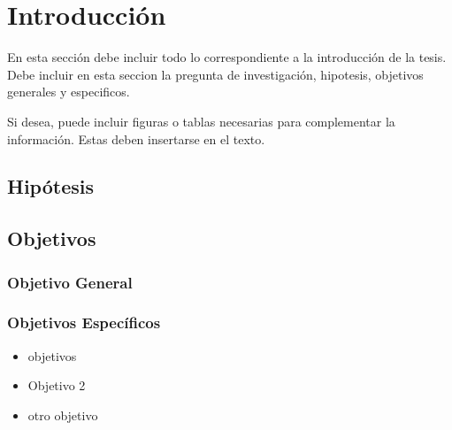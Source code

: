 \chapter{Introducción}
En esta sección debe incluir todo lo correspondiente a la introducción de la tesis. 
Debe incluir en esta seccion la pregunta de investigación, hipotesis, objetivos generales y especificos.

Si desea, puede incluir figuras o tablas necesarias para complementar la información.
Estas deben insertarse en el texto.

\section{Hipótesis}

\section{Objetivos}
\subsection{Objetivo General}

\subsection{Objetivos Específicos}
\begin{itemize}
    \item objetivos
    \item Objetivo 2
    \item otro objetivo  
\end{itemize}